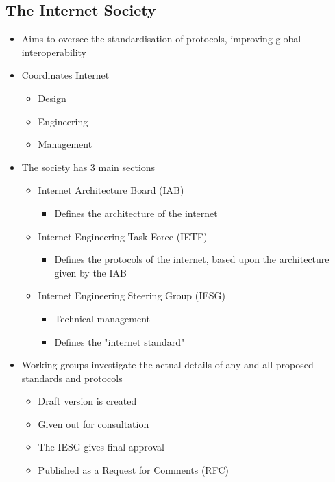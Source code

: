 
\subsection*{The Internet Society}

\begin{itemize}
  \item Aims to oversee the standardisation of protocols, improving global interoperability
  \item Coordinates Internet
  \begin{itemize}
    \item Design
    \item Engineering
    \item Management
  \end{itemize}
  \item The society has 3 main sections
  \begin{itemize}
    \item Internet Architecture Board (IAB)
    \begin{itemize}
      \item Defines the architecture of the internet
    \end{itemize}
    \item Internet Engineering Task Force (IETF)
    \begin{itemize}
      \item Defines the protocols of the internet, based upon the architecture given by the IAB
    \end{itemize}
    \item Internet Engineering Steering Group (IESG)
    \begin{itemize}
      \item Technical management
      \item Defines the "internet standard"
    \end{itemize}
  \end{itemize}
  \item Working groups investigate the actual details of any and all proposed standards and protocols
  \begin{itemize}
    \item Draft version is created
    \item Given out for consultation
    \item The IESG gives final approval
    \item Published as a Request for Comments (RFC)

\end{itemize}
\end{itemize}
